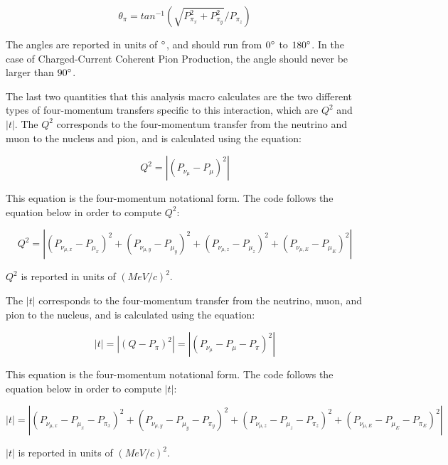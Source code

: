 \documentclass[11pt]{article}
\begin{document}
\begin{equation}
\theta_\pi = tan^{-1}(\sqrt{P_{\pi_x}^2 + P_{\pi_y}^2}/{P_{\pi_z}})
\end{equation}

\noindent
The angles are reported in units of $\degree$, and should run from $0\degree$ to $180\degree$. In the case of Charged-Current Coherent Pion Production, the angle should never be larger than $90\degree$.

The last two quantities that this analysis macro calculates are the two different types of four-momentum transfers specific to this interaction, which are $Q^2$ and $|t|$. The $Q^2$ corresponds to the four-momentum transfer from the neutrino and muon to the nucleus and pion, and is calculated using the equation:

\begin{equation}
Q^2 = |(P_{\nu_\mu} - P_\mu)^2|
\end{equation}

\noindent
This equation is the four-momentum notational form. The code follows the equation below in order to compute $Q^2$:

\begin{equation}
Q^2 = |(P_{\nu_{\mu,x}} - P_{\mu_x})^2 + (P_{\nu_{\mu,y}} - P_{\mu_y})^2 + (P_{\nu_{\mu,z}} - P_{\mu_z})^2 + (P_{\nu_{\mu,E}} - P_{\mu_E})^2|
\end{equation}

\noindent
$Q^2$ is reported in units of $(MeV/c)^2$.

The $|t|$ corresponds to the four-momentum transfer from the neutrino, muon, and pion to the nucleus, and is calculated using the equation:

\begin{equation}
|t| = |(Q - P_\pi)^2| = |(P_{\nu_\mu} - P_\mu - P_\pi)^2|
\end{equation}

\noindent
This equation is the four-momentum notational form. The code follows the equation below in order to compute $|t|$:

\begin{equation}
|t| = |(P_{\nu_{\mu,x}} - P_{\mu_x} - P_{\pi_x})^2 + (P_{\nu_{\mu,y}} - P_{\mu_y} - P_{\pi_y})^2 + (P_{\nu_{\mu,z}} - P_{\mu_z} - P_{\pi_z})^2 + (P_{\nu_{\mu,E}} - P_{\mu_E} - P_{\pi_E})^2|
\end{equation}

\noindent
$|t|$ is reported in units of $(MeV/c)^2$.

\end{document}
